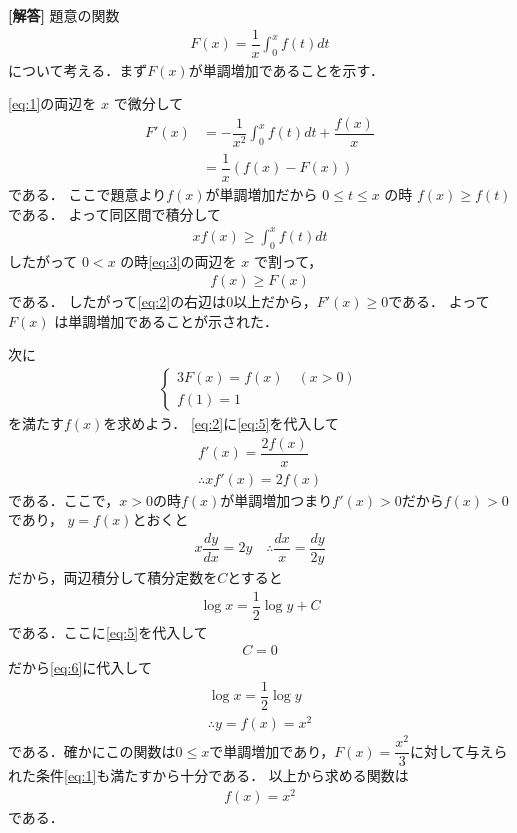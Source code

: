 \documentclass[../../main.tex]{subfiles}
\begin{document}
\begin{oframed}
  
\end{oframed}

{\bf [解答]}
題意の関数
\begin{align}
  F(x)=\dfrac{1}{x}\displaystyle\int_0^x f(t)dt \label{eq:1}
\end{align}
について考える．まず$F(x)$が単調増加であることを示す．

\cref{eq:1}の両辺を $x$ で微分して
\begin{align}
  F'(x)
  &=-\dfrac{1}{x^2}\int_0^x f(t)dt+\dfrac{f(x)}{x} \\
  &=\dfrac{1}{x}\left(f(x)-F(x)\right) \label{eq:2}
\end{align}
である．
ここで題意より$f(x)$が単調増加だから $0\le t\le x$ の時 $f(x)\ge f(t)$ である．
よって同区間で積分して
\begin{align}
  xf(x)\ge\int_0^x f(t)dt \label{eq:3}
\end{align}
したがって $0<x$ の時\cref{eq:3}の両辺を $x$ で割って，
\begin{align}
  f(x)\ge F(x) \label{eq:4}
\end{align}
である．
したがって\cref{eq:2}の右辺は$0$以上だから，$F'(x)\ge 0$である．
よって $F(x)$ は単調増加であることが示された．

次に
\begin{align}
  \begin{cases}
    3F(x) = f(x) \quad (x>0) \\
    f(1) = 1
  \end{cases} \label{eq:5}
\end{align}
を満たす$f(x)$を求めよう．
\cref{eq:2}に\cref{eq:5}を代入して
\begin{align}
  f'(x) = \dfrac{2f(x)}{x} \\
  \therefore
  xf'(x) = 2f(x)
\end{align}
である．ここで，$x>0$の時$f(x)$が単調増加つまり$f'(x)>0$だから$f(x)>0$であり，
$y=f(x)$とおくと
\begin{align}
  x\dfrac{dy}{dx} = 2y
  \quad\therefore
  \dfrac{dx}{x} = \dfrac{dy}{2y}
\end{align}
だから，両辺積分して積分定数を$C$とすると
\begin{align}
  \log x = \dfrac{1}{2}\log y + C \label{eq:6}
\end{align}
である．ここに\cref{eq:5}を代入して
\begin{align}
  C = 0
\end{align}
だから\cref{eq:6}に代入して
\begin{align}
  \log x = \dfrac{1}{2}\log y \\
  \therefore
  y = f(x) = x^2
\end{align}
である．確かにこの関数は$0 \le x$で単調増加であり，$F(x)=\dfrac{x^2}{3}$に対して与えられた条件\cref{eq:1}も満たすから十分である．
以上から求める関数は
\begin{align}
  f(x) = x^2
\end{align}
である．
\end{document}
